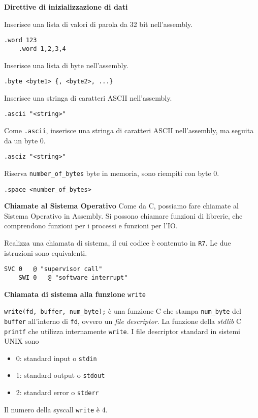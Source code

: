 \begin{defn}
	\textbf{Direttive di inizializzazione di dati}
	
	Inserisce una lista di valori di parola da 32 bit nell'assembly.
	\begin{lstlisting}[style=arm]
	.word 123
	.word 1,2,3,4
	\end{lstlisting}
	
	Inserisce una lista di byte nell'assembly.
	\begin{lstlisting}[style=arm]
	.byte <byte1> {, <byte2>, ...}
	\end{lstlisting}
	
	Inserisce una stringa di caratteri ASCII nell'assembly.
	\begin{lstlisting}[style=arm]
	.ascii "<string>"
	\end{lstlisting}
	
	Come \verb|.ascii|, inserisce una stringa di caratteri ASCII nell'assembly, ma seguita da un byte 0.
	\begin{lstlisting}[style=arm]
	.asciz "<string>"
	\end{lstlisting}
	
	Riserva \verb|number_of_bytes| byte in memoria, sono riempiti con byte 0.
	\begin{lstlisting}[style=arm]
	.space <number_of_bytes>
	\end{lstlisting}
\end{defn}

\begin{defn}
	\textbf{Chiamate al Sistema Operativo}
	Come da C, possiamo fare chiamate al Sistema Operativo in Assembly. Si possono chiamare funzioni di librerie, che comprendono funzioni per i processi e funzioni per l'IO.
	
	Realizza una chiamata di sistema, il cui codice è contenuto in \verb|R7|. Le due istruzioni sono equivalenti.
	\begin{lstlisting}[style=arm]
	SVC 0	@ "supervisor call"
	SWI 0	@ "software interrupt"
	\end{lstlisting}
\end{defn}

\begin{exmp}
	\textbf{Chiamata di sistema alla funzione} \verb|write|
	
	\verb|write(fd, buffer, num_byte);| è una funzione C che stampa \verb|num_byte| del \verb|buffer| all'interno di \verb|fd|, ovvero un \textit{file descriptor}. La funzione della \textit{stdlib} C \verb|printf| che utilizza internamente \verb|write|. I file descriptor standard in sistemi UNIX sono
	\begin{itemize}
		\item 0: standard input o \verb|stdin|
		\item 1: standard output o \verb|stdout|
		\item 2: standard error o \verb|stderr|
	\end{itemize}
	
	Il numero della syscall \verb|write| è 4.
\end{exmp}

